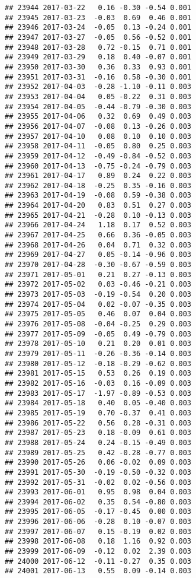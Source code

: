 \documentclass[
]{article}
\begin{document}
\begin{verbatim}
## 23944 2017-03-22   0.16 -0.30 -0.54 0.001
## 23945 2017-03-23  -0.03  0.69  0.46 0.001
## 23946 2017-03-24  -0.05  0.13 -0.24 0.001
## 23947 2017-03-27  -0.05  0.56 -0.52 0.001
## 23948 2017-03-28   0.72 -0.15  0.71 0.001
## 23949 2017-03-29   0.18  0.40 -0.07 0.001
## 23950 2017-03-30   0.36  0.33  0.93 0.001
## 23951 2017-03-31  -0.16  0.58 -0.30 0.001
## 23952 2017-04-03  -0.28 -1.10 -0.11 0.003
## 23953 2017-04-04   0.05 -0.22  0.31 0.003
## 23954 2017-04-05  -0.44 -0.79 -0.30 0.003
## 23955 2017-04-06   0.32  0.69  0.49 0.003
## 23956 2017-04-07  -0.08  0.13 -0.26 0.003
## 23957 2017-04-10   0.08  0.10  0.10 0.003
## 23958 2017-04-11  -0.05  0.80  0.25 0.003
## 23959 2017-04-12  -0.49 -0.84 -0.52 0.003
## 23960 2017-04-13  -0.75 -0.24 -0.79 0.003
## 23961 2017-04-17   0.89  0.24  0.22 0.003
## 23962 2017-04-18  -0.25  0.35 -0.16 0.003
## 23963 2017-04-19  -0.08  0.59 -0.38 0.003
## 23964 2017-04-20   0.83  0.51  0.27 0.003
## 23965 2017-04-21  -0.28  0.10 -0.13 0.003
## 23966 2017-04-24   1.18  0.17  0.52 0.003
## 23967 2017-04-25   0.66  0.36 -0.05 0.003
## 23968 2017-04-26   0.04  0.71  0.32 0.003
## 23969 2017-04-27   0.05 -0.14 -0.96 0.003
## 23970 2017-04-28  -0.30 -0.67 -0.59 0.003
## 23971 2017-05-01   0.21  0.27 -0.13 0.003
## 23972 2017-05-02   0.03 -0.46 -0.21 0.003
## 23973 2017-05-03  -0.19 -0.54  0.20 0.003
## 23974 2017-05-04   0.02 -0.07 -0.35 0.003
## 23975 2017-05-05   0.46  0.07  0.04 0.003
## 23976 2017-05-08  -0.04 -0.25  0.29 0.003
## 23977 2017-05-09  -0.05  0.49 -0.79 0.003
## 23978 2017-05-10   0.21  0.20  0.01 0.003
## 23979 2017-05-11  -0.26 -0.36 -0.14 0.003
## 23980 2017-05-12  -0.18 -0.29 -0.62 0.003
## 23981 2017-05-15   0.53  0.26  0.19 0.003
## 23982 2017-05-16  -0.03  0.16 -0.09 0.003
## 23983 2017-05-17  -1.97 -0.89 -0.53 0.003
## 23984 2017-05-18   0.40  0.05 -0.40 0.003
## 23985 2017-05-19   0.70 -0.37  0.41 0.003
## 23986 2017-05-22   0.56  0.28 -0.31 0.003
## 23987 2017-05-23   0.18 -0.09  0.61 0.003
## 23988 2017-05-24   0.24 -0.15 -0.49 0.003
## 23989 2017-05-25   0.42 -0.28 -0.77 0.003
## 23990 2017-05-26   0.06 -0.02  0.09 0.003
## 23991 2017-05-30  -0.19 -0.50 -0.32 0.003
## 23992 2017-05-31  -0.02  0.02 -0.56 0.003
## 23993 2017-06-01   0.95  0.98  0.04 0.003
## 23994 2017-06-02   0.35  0.54 -0.80 0.003
## 23995 2017-06-05  -0.17 -0.45  0.00 0.003
## 23996 2017-06-06  -0.28  0.10 -0.07 0.003
## 23997 2017-06-07   0.15 -0.19  0.02 0.003
## 23998 2017-06-08   0.18  1.16  0.92 0.003
## 23999 2017-06-09  -0.12  0.02  2.39 0.003
## 24000 2017-06-12  -0.11 -0.27  0.35 0.003
## 24001 2017-06-13   0.55  0.09 -0.14 0.003

\end{verbatim}
\end{document}
